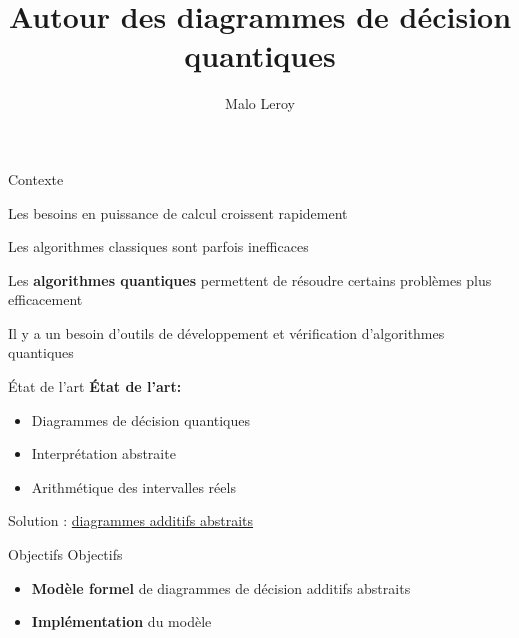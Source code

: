 \documentclass[french, 12pt]{beamer}
\title{Autour des diagrammes de décision quantiques}
\author{Malo Leroy}
\institute{Parcours recherche -- CentraleSupélec}
\begin{document}
\begin{frame}
    \titlepage
\end{frame}

\begin{frame}{Contexte}

\begin{center}
Les besoins en puissance de calcul croissent rapidement


Les algorithmes classiques sont parfois inefficaces

\pause
Les \textbf{algorithmes quantiques} permettent de résoudre certains problèmes plus efficacement
\end{center}
\end{frame}

\begin{frame}
Il y a un besoin d'outils de développement et vérification d'algorithmes quantiques
\end{frame}

\begin{frame}{État de l'art}
\textbf{État de l'art:}
\begin{itemize}
    \item Diagrammes de décision quantiques
    \item Interprétation abstraite
    \item Arithmétique des intervalles réels
\end{itemize}
\pause
\begin{center}
    Solution : \underline{diagrammes additifs abstraits}
\end{center}
\end{frame}

\begin{frame}{Objectifs}
Objectifs
\begin{itemize}
    \item \textbf{Modèle formel} de diagrammes de décision additifs abstraits
    \item \textbf{Implémentation} du modèle
\end{itemize}

\end{frame}
\end{document}
